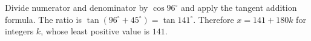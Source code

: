 Divide numerator and denominator by $\cos96^\circ$ and apply the tangent addition formula. The ratio is $\tan(96^\circ+45^\circ)=\tan141^\circ$. Therefore $x=141+180k$ for integers $k$, whose least positive value is $\boxed{141}$.
